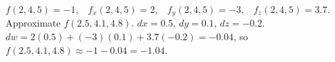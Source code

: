 {$f(2,4,5) = -1$,\ \ $f_x(2,4,5) = 2$,\ \ $f_y(2,4,5) = -3$,\ \ $f_z(2,4,5) = 3.7$. Approximate $f(2.5,4.1,4.8)$.
}
{$dx = 0.5$, $dy = 0.1$, $dz = -0.2$.\\
$dw = 2(0.5) + (-3)(0.1) + 3.7(-0.2) = -0.04$, so $f(2.5, 4.1, 4.8) \approx -1-0.04 = -1.04$.
}